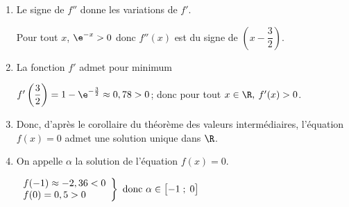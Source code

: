 \begin{enumerate}
\begin{enumerate}
$f'(x)=1\times \e^{-x} + \left (x+\dfrac{1}{2}\right )\times (-1) \e^{-x} + 1
= \left ( -x +\dfrac{1}{2}\right )\e^{-x}+1$, et donc

$f''(x)= -1\times \e^{-x} + \left (-x+\dfrac{1}{2}\right )\times (-1) \e^{-x}
= \left ( x-\dfrac{3}{2}\right )\e^{-x}$. 

		\item 
Le signe de $f''$ donne les variations de $f'$.

Pour tout $x$, $\e^{-x}>0$ donc $f''(x)$ est du 	signe de $\left (x-\dfrac{3}{2}\right )$.


		\item 
La fonction $f'$ admet pour minimum

$f'\left (\dfrac{3}{2}\right ) =1-\e^{-\frac{3}{2}} \approx 0,78>0$; donc   pour tout $x \in \R,\: f'(x) > 0$.
		
		\item 
{}		

Donc, d'après le corollaire du théorème des valeurs intermédiaires, l'équation $f(x) = 0$ admet une solution unique dans $\R$.
		
		\item 
On appelle $\alpha$ la solution de l'équation $f(x) = 0$.

$\left .
\begin{array}{l}
f(-1)\approx -2,36<0\\
f(0)=0,5>0
\end{array}
\right \}
\text{ donc } \alpha\in \left [-1\;;\;0\strut\right ]$
		

\end{enumerate}
\end{enumerate}
